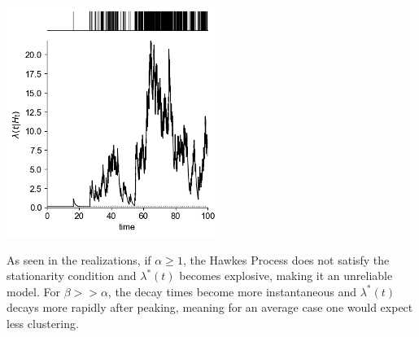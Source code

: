 \documentclass[landscape,final,a0paper]{../baposter}
\begin{document}
\begin{poster}
{\begin{minipage}[t]{0.3\textwidth}
\end{minipage}
\hfill
\begin{minipage}[t]{0.3\textwidth}
    \centering
    \includegraphics[width=\textwidth]{Blackboard files/img/Picture/Picture3.png}
\end{minipage}


\vspace{0.5em}

As seen in the realizations, if $\alpha \geq 1$, the Hawkes Process does not satisfy the stationarity condition and $\lambda^*(t)$ becomes explosive, making it an unreliable model. For $\beta >> \alpha$, the decay times become more instantaneous and $\lambda^*(t)$ decays more rapidly after peaking, meaning for an average case one would expect less clustering.
	
  }
  





\end{poster}
\end{document}
